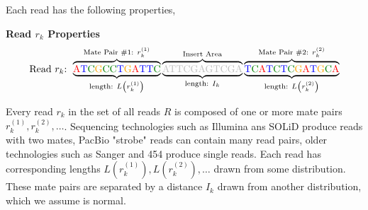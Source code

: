 \documentclass[phd,tocprelim]{cornell}
\begin{document}
Each read has the following properties,
\begin{center}
\textbf{Read $r_{k}$ Properties}
\[\text{Read $r_{k}$: }\overbrace{\underbrace{\text{{\color{red} A}{\color{blue} T}{\color{MyDarkGreen} C}{\color{orange} G}{\color{MyDarkGreen} C}{\color{MyDarkGreen} C}{\color{blue} T}{\color{orange} G}{\color{red} A}{\color{blue} T}{\color{blue} T}{\color{MyDarkGreen} C}}}_{\text{length: } L\left(r_{k}^{(1)}\right) }}^{\text{Mate Pair \#1: } r_{k}^{(1)}}
\overbrace{\underbrace{\text{{\color{gray} ATTCGAGTCGA}}}_{\text{length: } I_{k} }}^{\text{Insert Area}}
\overbrace{\underbrace{\text{{\color{blue} T}{\color{MyDarkGreen} C}{\color{red} A}{\color{blue} T}{\color{MyDarkGreen} C}{\color{blue} T}{\color{MyDarkGreen} C}{\color{orange} G}{\color{red} A}{\color{blue} T}{\color{orange} G}{\color{MyDarkGreen} C}{\color{red} A}}}_{\text{length: } L\left(r_{k}^{(2)}\right) }}^{\text{Mate Pair \#2: } r_{k}^{(2)}}\]
\end{center}
Every read $r_{k}$ in the set of all reads $R$ is composed of one or more mate pairs $r_{k}^{(1)}, r_{k}^{(2)}, \ldots$. Sequencing technologies such as Illumina ans SOLiD produce reads with two mates, PacBio "strobe" reads can contain many read pairs, older technologies such as Sanger and 454 produce single reads. Each read has corresponding lengths $L\left(r_{k}^{(1)}\right), L\left(r_{k}^{(2)}\right), \ldots$ drawn from some distribution. These mate pairs are separated by a distance $I_{k}$ drawn from another distribution, which we assume is normal.
\end{document}
